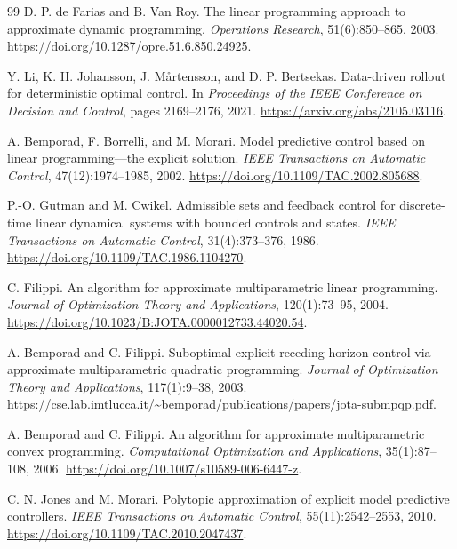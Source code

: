 \documentclass[10pt]{article}
\begin{document}
\begin{thebibliography}{99}
D. P. de Farias and B. Van Roy.
\newblock The linear programming approach to approximate dynamic programming.
\newblock \emph{Operations Research}, 51(6):850--865, 2003.
\newblock \url{https://doi.org/10.1287/opre.51.6.850.24925}.

Y. Li, K. H. Johansson, J. M\aa rtensson, and D. P. Bertsekas.
\newblock Data-driven rollout for deterministic optimal control.
\newblock In \emph{Proceedings of the IEEE Conference on Decision and Control}, pages 2169--2176, 2021.
\newblock \url{https://arxiv.org/abs/2105.03116}.

A. Bemporad, F. Borrelli, and M. Morari.
\newblock Model predictive control based on linear programming---the explicit solution.
\newblock \emph{IEEE Transactions on Automatic Control}, 47(12):1974--1985, 2002.
\newblock \url{https://doi.org/10.1109/TAC.2002.805688}.

P.-O. Gutman and M. Cwikel.
\newblock Admissible sets and feedback control for discrete-time linear dynamical systems with bounded controls and states.
\newblock \emph{IEEE Transactions on Automatic Control}, 31(4):373--376, 1986.
\newblock \url{https://doi.org/10.1109/TAC.1986.1104270}.

C. Filippi.
\newblock An algorithm for approximate multiparametric linear programming.
\newblock \emph{Journal of Optimization Theory and Applications}, 120(1):73--95, 2004.
\newblock \url{https://doi.org/10.1023/B:JOTA.0000012733.44020.54}.

A. Bemporad and C. Filippi.
\newblock Suboptimal explicit receding horizon control via approximate multiparametric quadratic programming.
\newblock \emph{Journal of Optimization Theory and Applications}, 117(1):9--38, 2003.
\newblock \url{https://cse.lab.imtlucca.it/~bemporad/publications/papers/jota-submpqp.pdf}.

A. Bemporad and C. Filippi.
\newblock An algorithm for approximate multiparametric convex programming.
\newblock \emph{Computational Optimization and Applications}, 35(1):87--108, 2006.
\newblock \url{https://doi.org/10.1007/s10589-006-6447-z}.

C. N. Jones and M. Morari.
\newblock Polytopic approximation of explicit model predictive controllers.
\newblock \emph{IEEE Transactions on Automatic Control}, 55(11):2542--2553, 2010.
\newblock \url{https://doi.org/10.1109/TAC.2010.2047437}.


\end{thebibliography}
\end{document}
